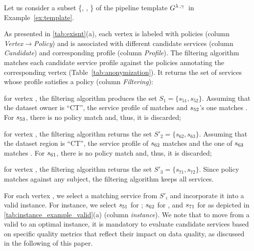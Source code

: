 \begin{example}[\bf \pipelineInstance]\label{ex:instance}

Let us consider a subset \{, , \} of the pipeline template $G^{\lambda\,,\gamma\,}$ in Example~\ref{ex:template}.

As presented in \cref{tab:exisnt}(a), each vertex is labeled with policies (column \emph{Vertex$\rightarrow$Policy}) and is associated with different candidate services (column \emph{Candidate}) and corresponding profile (column \emph{Profile}). The filtering algorithm matches each candidate service profile against the policies annotating the corresponding vertex (Table~\ref{tab:anonymization}). It returns the set of services whose profile satisfies a policy (column \emph{Filtering}):
\begin{enumerate*}[label=\textit{\roman*})]
  \item for vertex , the filtering algorithm produces the set $S_{1}=\{s_{51},s_{52}\}$. Assuming that the dataset owner is ``CT'', the service profile of  matches  and $s_{52}$'s one matches . For $s_{53}$, there is no policy match and, thus, it is discarded;
  \item for vertex , the filtering algorithm returns the set $S'_2=\{s_{62},s_{63}\}$. Assuming that the dataset region is ``CT'', the service profile of $s_{62}$ matches  and the one of $s_{63}$ matches . For $s_{61}$, there is no policy match and, thus, it is discarded;
  \item for vertex , the filtering algorithm returns the set $S'_3=\{s_{71},s_{72}\}$. Since policy  matches against any subject, the filtering algorithm keeps all services.
\end{enumerate*}

For each vertex , we select a matching service  from $S'_i$ and incorporate it into a valid instance. For instance, we select $s_{51}$ for ; $s_{62}$ for , and $s_{71}$ for  as depicted in \cref{tab:instance_example_valid}(a) (column \emph{instance}). We note that to move from a valid to an optimal instance, it is mandatory to evaluate candidate services based on specific quality metrics that reflect their impact on data quality, as discussed in the following of this paper.

\end{example}

